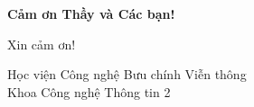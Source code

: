 \documentclass[aspectratio=169]{beamer}
\begin{document}
\begin{frame}{}
    \begin{center}
        \vspace{1.5cm}
        {\Huge\bfseries Cảm ơn Thầy và Các bạn!}
        \vspace{1cm}

        {\Large Xin cảm ơn!}
        \vspace{0.5cm}

        {\normalsize Học viện Công nghệ Bưu chính Viễn thông \\ Khoa Công nghệ Thông tin 2}
    \end{center}
\end{frame}
\end{document}

